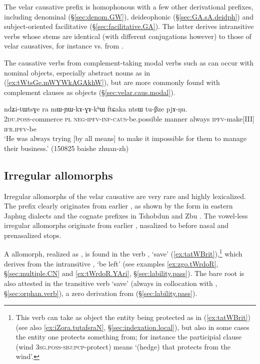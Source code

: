 The velar causative  prefix is homophonous with a few other derivational prefixes, including denominal (§\ref{sec:denom.GW}), deideophonic (§\ref{sec:GA.sA.deidph}) and subject-oriented facilitative (§\ref{sec:facilitative.GA}). The latter derives intransitive verbs whose stems are identical (with different conjugations however) to those of velar causatives, for instance  vs.   from .
  

The causative verbs from com\-ple\-ment-taking modal verbs such as  can occur with nominal objects, especially abstract nouns as in (\ref{ex:tWtsGe.mWYWkAGAkhW}), but are more commonly found with complement clauses as objects (§\ref{sec:velar.caus.modal}).
 \newpage
\begin{exe}
\ex \label{ex:tWtsGe.mWYWkAGAkhW}
 \gll ndʑi-tɯtsɣe ra mɯ-ɲɯ-kɤ-ɣɤ-kʰɯ ftɕaka ntsɯ tu-βze pjɤ-ŋu. \\
 \textsc{2du}.\textsc{poss}-commerce \textsc{pl} \textsc{neg}-\textsc{ipfv}-\textsc{inf}-\textsc{caus}-be.possible manner always \textsc{ipfv}-make[III] \textsc{ifr}.\textsc{ipfv}-be \\
 \glt `He was always trying [by all means] to make it impossible for them to manage their business.' (150825 baishe zhuan-zh)
\end{exe} 

\subsection{Irregular allomorphs} \label{sec:causative.m}
Irregular allomorphs of the velar causative are very rare and highly lexicalized. The  prefix clearly originates from earlier , as shown by the form  in eastern Japhug dialects and the cognate prefixes  in Tshobdun and Zbu \citep{jackson14morpho}.  The vowel-less irregular allomorphs originate from earlier , nasalized to  before nasal and prenasalized stops. 

A  allomorph, realized as , is found in the verb , `save' (\ref{ex:tatWBrit}),\footnote{This verb can take as object the entity being protected as in (\ref{ex:tatWBrit}) (see also \ref{ex:iZora.tutafsraN}, §\ref{sec:indexation.local}), but also in some cases the entity one protects something from; for instance the participial clause  (wind \textsc{3sg}.\textsc{poss}-\textsc{sbj}:\textsc{pcp}-protect) means `(hedge) that protects from the wind'. } which derives from the intransitive , `be left' (see examples \ref{ex:zgo.tWrdoR}, §\ref{sec:multiple.CN} and \ref{ex:tWrdoR.YAri}, §\ref{sec:lability.pass}). The bare root  is also attested in the transitive verb  `save' (always in collocation with , §\ref{sec:orphan.verb}), a zero derivation from  (§\ref{sec:lability.pass}). 

